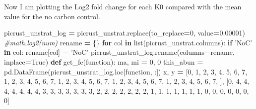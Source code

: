 \documentclass[
]{article}
\newenvironment{Shaded}{\begin{snugshade}}{\end{snugshade}}
\newcommand{\BuiltInTok}[1]{#1}
\newcommand{\CommentTok}[1]{\textcolor[rgb]{0.56,0.35,0.01}{\textit{#1}}}
\newcommand{\ControlFlowTok}[1]{\textcolor[rgb]{0.13,0.29,0.53}{\textbf{#1}}}
\newcommand{\DecValTok}[1]{\textcolor[rgb]{0.00,0.00,0.81}{#1}}
\newcommand{\FloatTok}[1]{\textcolor[rgb]{0.00,0.00,0.81}{#1}}
\newcommand{\KeywordTok}[1]{\textcolor[rgb]{0.13,0.29,0.53}{\textbf{#1}}}
\newcommand{\NormalTok}[1]{#1}
\newcommand{\OperatorTok}[1]{\textcolor[rgb]{0.81,0.36,0.00}{\textbf{#1}}}
\newcommand{\StringTok}[1]{\textcolor[rgb]{0.31,0.60,0.02}{#1}}
\newcommand{\VariableTok}[1]{\textcolor[rgb]{0.00,0.00,0.00}{#1}}
\begin{document}
Now I am plotting the Log2 fold change for each K0 compared with the
mean value for the no carbon control.

\begin{Shaded}
\begin{Highlighting}[]
\NormalTok{picrust_unstrat_log }\OperatorTok{=}\NormalTok{ picrust_unstrat.replace(to_replace}\OperatorTok{=}\DecValTok{0}\NormalTok{, value}\OperatorTok{=}\FloatTok{0.00001}\NormalTok{)}
\CommentTok{#math.log2(num)}
\NormalTok{rename }\OperatorTok{=}\NormalTok{ \{\}}
\ControlFlowTok{for}\NormalTok{ col }\KeywordTok{in} \BuiltInTok{list}\NormalTok{(picrust_unstrat.columns):}
  \ControlFlowTok{if} \StringTok{'NoC'} \KeywordTok{in}\NormalTok{ col:}
\NormalTok{    rename[col] }\OperatorTok{=} \StringTok{'NoC'}
\NormalTok{picrust_unstrat_log.rename(columns}\OperatorTok{=}\NormalTok{rename, inplace}\OperatorTok{=}\VariableTok{True}\NormalTok{)}
\KeywordTok{def}\NormalTok{ get_fc(function):}
\NormalTok{  ma, mi }\OperatorTok{=} \DecValTok{0}\NormalTok{, }\DecValTok{0}
\NormalTok{  this_abun }\OperatorTok{=}\NormalTok{ pd.DataFrame(picrust_unstrat_log.loc[function, :])}
\NormalTok{  x, y }\OperatorTok{=}\NormalTok{ [}\DecValTok{0}\NormalTok{, }\DecValTok{1}\NormalTok{, }\DecValTok{2}\NormalTok{, }\DecValTok{3}\NormalTok{, }\DecValTok{4}\NormalTok{, }\DecValTok{5}\NormalTok{, }\DecValTok{6}\NormalTok{, }\DecValTok{7}\NormalTok{, }\DecValTok{1}\NormalTok{, }\DecValTok{2}\NormalTok{, }\DecValTok{3}\NormalTok{, }\DecValTok{4}\NormalTok{, }\DecValTok{5}\NormalTok{, }\DecValTok{6}\NormalTok{, }\DecValTok{7}\NormalTok{, }\DecValTok{1}\NormalTok{, }\DecValTok{2}\NormalTok{, }\DecValTok{3}\NormalTok{, }\DecValTok{4}\NormalTok{, }\DecValTok{5}\NormalTok{, }\DecValTok{6}\NormalTok{, }\DecValTok{7}\NormalTok{, }\DecValTok{1}\NormalTok{, }\DecValTok{2}\NormalTok{, }\DecValTok{3}\NormalTok{, }\DecValTok{4}\NormalTok{, }\DecValTok{5}\NormalTok{, }\DecValTok{6}\NormalTok{, }\DecValTok{7}\NormalTok{, }\DecValTok{1}\NormalTok{, }\DecValTok{2}\NormalTok{, }\DecValTok{3}\NormalTok{, }\DecValTok{4}\NormalTok{, }\DecValTok{5}\NormalTok{, }\DecValTok{6}\NormalTok{, }\DecValTok{7}\NormalTok{, ], [}\DecValTok{0}\NormalTok{, }\DecValTok{4}\NormalTok{, }\DecValTok{4}\NormalTok{, }\DecValTok{4}\NormalTok{, }\DecValTok{4}\NormalTok{, }\DecValTok{4}\NormalTok{, }\DecValTok{4}\NormalTok{, }\DecValTok{4}\NormalTok{, }\DecValTok{3}\NormalTok{, }\DecValTok{3}\NormalTok{, }\DecValTok{3}\NormalTok{, }\DecValTok{3}\NormalTok{, }\DecValTok{3}\NormalTok{, }\DecValTok{3}\NormalTok{, }\DecValTok{3}\NormalTok{, }\DecValTok{2}\NormalTok{, }\DecValTok{2}\NormalTok{, }\DecValTok{2}\NormalTok{, }\DecValTok{2}\NormalTok{, }\DecValTok{2}\NormalTok{, }\DecValTok{2}\NormalTok{, }\DecValTok{2}\NormalTok{, }\DecValTok{1}\NormalTok{, }\DecValTok{1}\NormalTok{, }\DecValTok{1}\NormalTok{, }\DecValTok{1}\NormalTok{, }\DecValTok{1}\NormalTok{, }\DecValTok{1}\NormalTok{, }\DecValTok{1}\NormalTok{, }\DecValTok{0}\NormalTok{, }\DecValTok{0}\NormalTok{, }\DecValTok{0}\NormalTok{, }\DecValTok{0}\NormalTok{, }\DecValTok{0}\NormalTok{, }\DecValTok{0}\NormalTok{, }\DecValTok{0}\NormalTok{]}

\end{Highlighting}
\end{Shaded}
\end{document}
